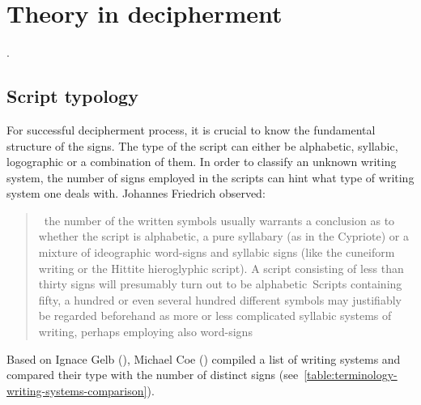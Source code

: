 \documentclass[../main.tex]{subfiles}
\begin{document}
\section{Theory in decipherment}
.

\subsection{Script typology}
For successful decipherment process, it is crucial to know the fundamental structure of the signs.
The type of the script can either be alphabetic, syllabic, logographic or a combination of them.
In order to classify an unknown writing system, the number of signs employed in the scripts
can hint what type of writing system one deals with.
Johannes Friedrich observed:
\blockquote[{\cite[152]{friedrich1957}}]{\elide~the number of the written symbols usually warrants a 
conclusion as to whether the script is alphabetic, a pure syllabary (as in the Cypriote) or a
mixture of ideographic word-signs and syllabic signs (like the cuneiform writing or the Hittite
hieroglyphic script). A script consisting of less than thirty signs will presumably turn out to
be alphabetic\elide~Scripts containing fifty, a hundred or even several hundred different symbols
may justifiably be regarded beforehand as more or less complicated syllabic systems of writing,
perhaps employing also word-signs\elide}.
Based on Ignace Gelb (\cite[115]{gelb1963}), Michael Coe (\cite[43]{coe1992}) compiled a list
of writing systems and compared their type with the number of distinct signs
(see~\ref{table:terminology-writing-systems-comparison}).
\end{document}
